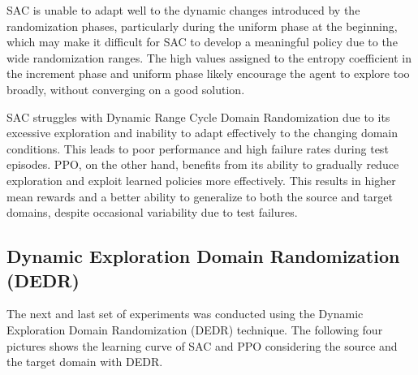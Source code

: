 \documentclass[12pt]{article}
\begin{document}
SAC is unable to adapt well to the dynamic changes introduced by the randomization phases, particularly during the uniform phase at the beginning, which may make it difficult for SAC to develop a meaningful policy due to the wide randomization ranges.
The high values assigned to the entropy coefficient in the increment phase and uniform phase likely encourage the agent to explore too broadly, without converging on a good solution. 

SAC struggles with Dynamic Range Cycle Domain Randomization due to its excessive exploration and inability to adapt effectively to the changing domain conditions. This leads to poor performance and high failure rates during test episodes.
PPO, on the other hand, benefits from its ability to gradually reduce exploration and exploit learned policies more effectively. This results in higher mean rewards and a better ability to generalize to both the source and target domains, despite occasional variability due to test failures.

\subsection{Dynamic Exploration Domain Randomization (DEDR)}

The next and last set of experiments was conducted using the Dynamic Exploration Domain Randomization (DEDR) technique. The following four pictures shows the learning curve of SAC and PPO considering the source and the target domain with DEDR.
\end{document}

